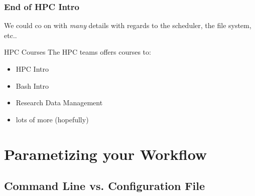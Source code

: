 \begin{frame}
  \frametitle{End of HPC Intro}
  We could co on with \emph{many} details with regards to the scheduler, the file system, etc..
  \begin{block}{HPC Courses}
   The HPC teams offers courses to:
   \begin{itemize}
    \item HPC Intro
    \item Bash Intro
    \item Research Data Management
    \item lots of more (hopefully)
   \end{itemize}
  \end{block}
  \pause
\end{frame}


\section{Parametizing your Workflow}

\subsection{Command Line vs. Configuration File}

